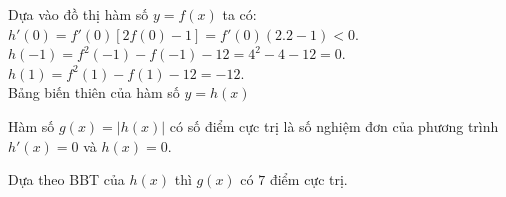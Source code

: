 \begin{ex}
{        Dựa vào đồ thị hàm số $y=f\left(x\right)$ ta có: $h'(0)=f'(0)\left[ 2f(0)-1 \right]=f'(0)(2.2-1)<0$.\\
        $h(-1)=f^2(-1)-f(-1)-12=4^{2}-4-12=0$.\\
        $h(1)=f^2(1)-f(1)-12=-12$.\\
        Bảng biến thiên của hàm số $y=h\left(x\right)$
        \begin{center}
        \end{center}
        Hàm số $g(x)=|h(x)|$ có số điểm cực trị là số nghiệm đơn của phương trình $h'(x)=0$ và $h(x)=0$.
        \item Dựa theo BBT của $h(x)$ thì $g(x)$ có $7$ điểm cực trị.
    }
\end{ex}
